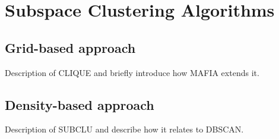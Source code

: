 \section{Subspace Clustering Algorithms}

\subsection{Grid-based approach}
Description of CLIQUE and briefly introduce how MAFIA extends it.

\subsection{Density-based approach}
Description of SUBCLU and describe how it relates to DBSCAN.